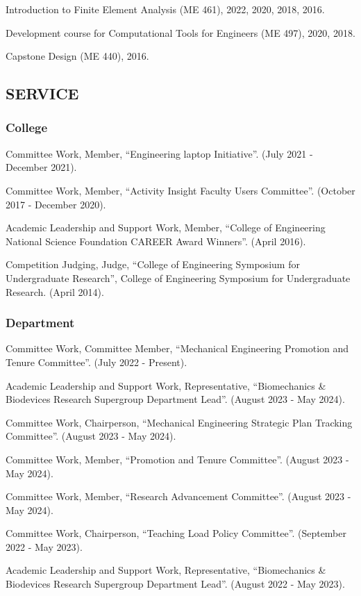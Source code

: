 \documentclass[11pt]{article}
\begin{document}
Introduction to Finite Element Analysis (ME 461), 2022, 2020, 2018, 2016.

Development course for Computational Tools for Engineers (ME 497), 2020, 2018.

Capstone Design (ME 440), 2016.

\subsection{SERVICE}\label{service}

\subsubsection{College}\label{college}

Committee Work, Member, ``Engineering laptop Initiative''. 
(July
2021 - December 2021).

Committee Work, Member, ``Activity Insight Faculty Users
Committee''. 
(October 2017 - December 2020).

Academic Leadership and Support Work, Member, ``College of
Engineering National Science Foundation CAREER Award Winners''. 
(April
2016).

Competition Judging, Judge, ``College of Engineering Symposium
for Undergraduate Research'', College of Engineering Symposium for
Undergraduate Research. 
(April 2014).

\subsubsection{Department}\label{department}

Committee Work, Committee Member, ``Mechanical Engineering
Promotion and Tenure Committee''. 
(July 2022 - Present).

Academic Leadership and Support Work, Representative,
``Biomechanics \& Biodevices Research Supergroup Department Lead''.
(August 2023 - May 2024).

Committee Work, Chairperson, ``Mechanical Engineering
Strategic Plan Tracking Committee''. 
(August 2023 - May 2024).

Committee Work, Member, ``Promotion and Tenure Committee''.
(August 2023 - May 2024).

Committee Work, Member, ``Research Advancement Committee''.
(August 2023 - May 2024).

Committee Work, Chairperson, ``Teaching Load Policy
Committee''. 
(September 2022 - May 2023).

Academic Leadership and Support Work, Representative,
``Biomechanics \& Biodevices Research Supergroup Department Lead''.
(August 2022 - May 2023).
\end{document}

